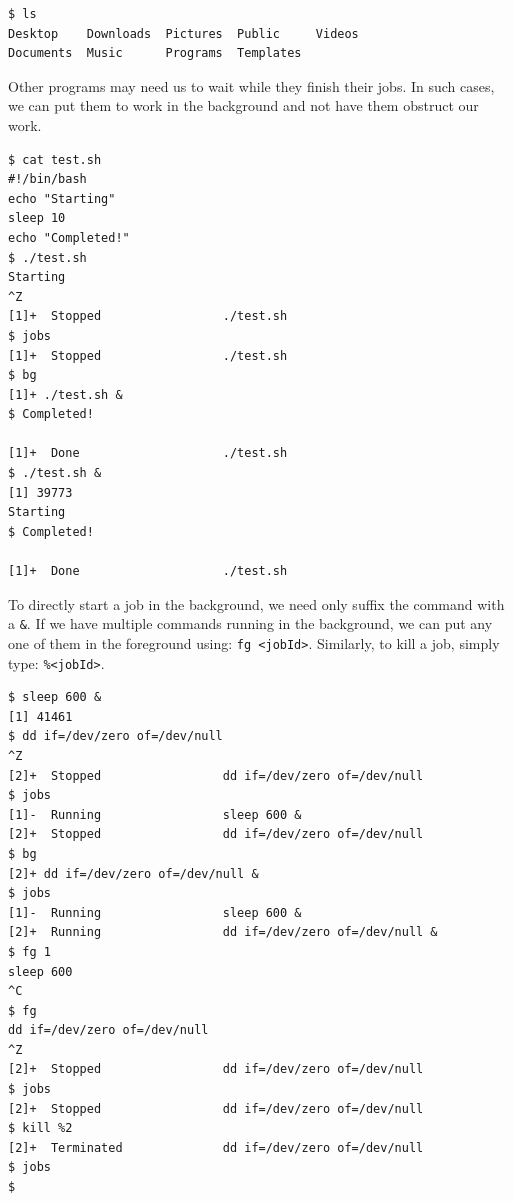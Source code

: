 \vspace{-15pt}
\begin{verbatim}
$ ls
Desktop    Downloads  Pictures  Public     Videos
Documents  Music      Programs  Templates
\end{verbatim}
\vspace{-10pt}

\noindent
Other programs may need us to wait while they finish their jobs. In such cases, we can put them to work in the background and not have them obstruct our work. 

\vspace{-15pt}
\begin{verbatim}
$ cat test.sh
#!/bin/bash
echo "Starting"
sleep 10
echo "Completed!"
$ ./test.sh
Starting
^Z
[1]+  Stopped                 ./test.sh
$ jobs
[1]+  Stopped                 ./test.sh
$ bg
[1]+ ./test.sh &
$ Completed!

[1]+  Done                    ./test.sh
$ ./test.sh &
[1] 39773
Starting
$ Completed!

[1]+  Done                    ./test.sh
\end{verbatim}
\vspace{-10pt}

\noindent
To directly start a job in the background, we need only suffix the command with a \verb|&|. If we have multiple commands running in the background, we can put any one of them in the foreground using: \verb|fg <jobId>|. Similarly, to kill a job, simply type: \verb|%<jobId>|.

\vspace{-15pt}
\begin{verbatim}
$ sleep 600 &
[1] 41461
$ dd if=/dev/zero of=/dev/null
^Z
[2]+  Stopped                 dd if=/dev/zero of=/dev/null
$ jobs
[1]-  Running                 sleep 600 &
[2]+  Stopped                 dd if=/dev/zero of=/dev/null
$ bg 
[2]+ dd if=/dev/zero of=/dev/null &
$ jobs
[1]-  Running                 sleep 600 &
[2]+  Running                 dd if=/dev/zero of=/dev/null &
$ fg 1
sleep 600
^C
$ fg
dd if=/dev/zero of=/dev/null
^Z
[2]+  Stopped                 dd if=/dev/zero of=/dev/null
$ jobs
[2]+  Stopped                 dd if=/dev/zero of=/dev/null
$ kill %2
[2]+  Terminated              dd if=/dev/zero of=/dev/null
$ jobs
$ 
\end{verbatim}
\vspace{-10pt}


